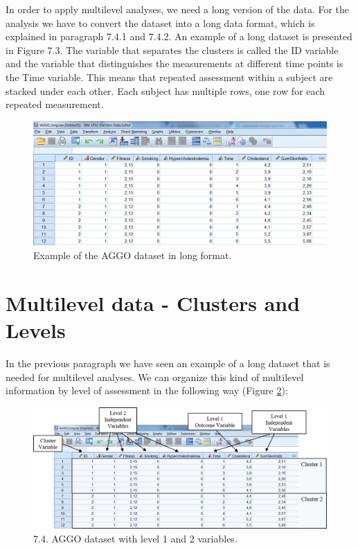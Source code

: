 \documentclass[]{book}
\begin{document}
In order to apply multilevel analyses, we need a long version of the
data. For the analysis we have to convert the dataset into a long data
format, which is explained in paragraph 7.4.1 and 7.4.2. An example of a
long dataset is presented in Figure 7.3. The variable that separates the
clusters is called the ID variable and the variable that distinguishes
the measurements at different time points is the Time variable. This
means that repeated assessment within a subject are stacked under each
other. Each subject has multiple rows, one row for each repeated
measurement.

\begin{figure}

{\centering \includegraphics[width=0.9\linewidth]{images/fig7.3} 

}

\caption{Example of the AGGO dataset in long format.}\label{fig:fig73}
\end{figure}

\section{Multilevel data - Clusters and
Levels}\label{multilevel-data---clusters-and-levels}

In the previous paragraph we have seen an example of a long dataset that
is needed for multilevel analyses. We can organize this kind of
multilevel information by level of assessment in the following way
(Figure \ref{fig:fig74}):

\begin{figure}

{\centering \includegraphics[width=0.9\linewidth]{images/fig7.4} 

}

\caption{7.4. AGGO dataset with level 1 and 2 variables.}\label{fig:fig74}
\end{figure}
\end{document}

